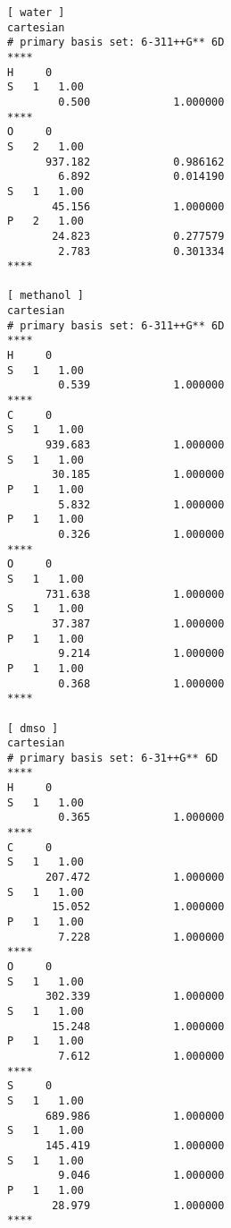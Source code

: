 \documentclass[aip,jcp,amsmath,amssymb,reprint,floatfix]{revtex4-1}
\begin{document}
\begin{verbatim}
[ water ]
cartesian
# primary basis set: 6-311++G** 6D
****
H     0
S   1   1.00
        0.500             1.000000
****
O     0
S   2   1.00
      937.182             0.986162 
        6.892             0.014190 
S   1   1.00
       45.156             1.000000
P   2   1.00
       24.823             0.277579 
        2.783             0.301334 
****

[ methanol ]
cartesian
# primary basis set: 6-311++G** 6D
****
H     0
S   1   1.00
        0.539             1.000000
****
C     0
S   1   1.00
      939.683             1.000000
S   1   1.00
       30.185             1.000000
P   1   1.00
        5.832             1.000000
P   1   1.00
        0.326             1.000000
****
O     0
S   1   1.00
      731.638             1.000000
S   1   1.00
       37.387             1.000000
P   1   1.00
        9.214             1.000000
P   1   1.00
        0.368             1.000000
****

[ dmso ]
cartesian
# primary basis set: 6-31++G** 6D
****
H     0
S   1   1.00
        0.365             1.000000
****
C     0
S   1   1.00
      207.472             1.000000
S   1   1.00
       15.052             1.000000
P   1   1.00
        7.228             1.000000
****
O     0
S   1   1.00
      302.339             1.000000
S   1   1.00
       15.248             1.000000
P   1   1.00
        7.612             1.000000
****
S     0
S   1   1.00
      689.986             1.000000
S   1   1.00
      145.419             1.000000
S   1   1.00
        9.046             1.000000
P   1   1.00
       28.979             1.000000
****
\end{verbatim}

\vfill
\end{document}
